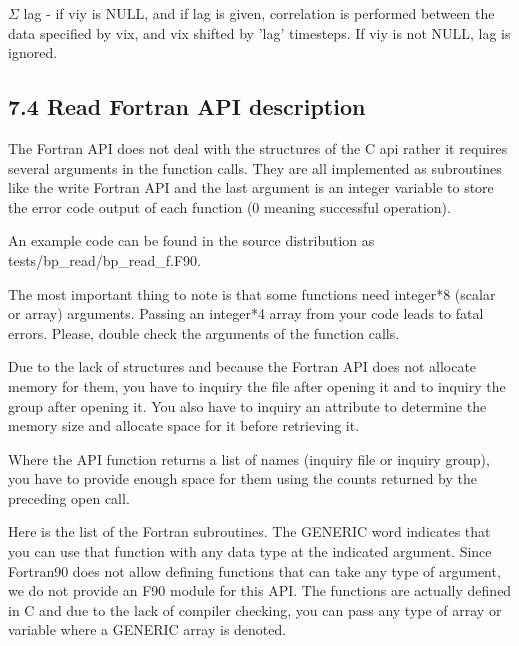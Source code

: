 \vspace{10pt}
\leftskip=0pt
\ensuremath{\Sigma} lag - if viy is NULL, and if lag is given, correlation is performed 
between the data specified by vix, and vix shifted by 'lag' timesteps.  If viy 
is not NULL, lag is ignored.\label{HRef144348794}\label{HRef144348801}\label{HToc182553413}

\vspace{10pt}
\subsection*{{\large 7.4 }{\large \textbf{Read Fortran API description}}}

\vspace{10pt}
The Fortran API does not deal with the structures of the C api rather it requires 
several arguments in the function calls.  They are all implemented as subroutines 
like the write Fortran API and the last argument is an integer variable to store 
the error code output of each function (0 meaning successful operation). 

\vspace{10pt}
An example code can be found in the source distribution as tests/bp\_read/bp\_read\_f.F90.

\vspace{10pt}
The most important thing to note is that some functions need integer*8 (scalar 
or array) arguments. Passing an integer*4 array from your code leads to fatal errors. 
Please, double check the arguments of the function calls. 

\vspace{10pt}
Due to the lack of structures and because the Fortran API does not allocate memory 
for them, you have to inquiry the file after opening it and to inquiry the group 
after opening it. You also have to inquiry an attribute to determine the memory 
size and allocate space for it before retrieving it. 

\vspace{10pt}
Where the API function returns a list of names (inquiry file or inquiry group), 
you have to provide enough space for them using the counts returned by the preceding 
open call. 

\vspace{10pt}
Here is the list of the Fortran subroutines. The GENERIC word indicates that you 
can use that function with any data type at the indicated argument. Since Fortran90 
does not allow defining functions that can take any type of argument, we do not 
provide an F90 module for this API. The functions are actually defined in C and 
due to the lack of compiler checking, you can pass any type of array or variable 
where a GENERIC array is denoted. 

